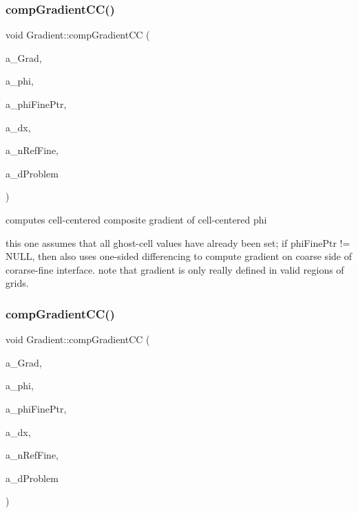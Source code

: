 \subsubsection{\texorpdfstring{comp\+Gradient\+C\+C()}{compGradientCC()}\hspace{0.1cm}{\footnotesize\ttfamily [5/6]}}
{\footnotesize\ttfamily void Gradient\+::comp\+Gradient\+CC (\begin{DoxyParamCaption}\item[{\textbf{ Level\+Data}$<$ \textbf{ F\+Array\+Box} $>$ \&}]{a\+\_\+\+Grad,  }\item[{const \textbf{ Level\+Data}$<$ \textbf{ F\+Array\+Box} $>$ \&}]{a\+\_\+phi,  }\item[{const \textbf{ Level\+Data}$<$ \textbf{ F\+Array\+Box} $>$ $\ast$}]{a\+\_\+phi\+Fine\+Ptr,  }\item[{const \textbf{ Real}}]{a\+\_\+dx,  }\item[{const int}]{a\+\_\+n\+Ref\+Fine,  }\item[{const \textbf{ Problem\+Domain} \&}]{a\+\_\+d\+Problem }\end{DoxyParamCaption})\hspace{0.3cm}{\ttfamily [static]}}



computes cell-\/centered composite gradient of cell-\/centered phi 

this one assumes that all ghost-\/cell values have already been set; if phi\+Fine\+Ptr != N\+U\+LL, then also uses one-\/sided differencing to compute gradient on coarse side of corarse-\/fine interface. note that gradient is only really defined in valid regions of grids. \mbox{\label{class_gradient_ad59fcf73da0f075761f2363b1d1e6c2b}} 
\subsubsection{\texorpdfstring{comp\+Gradient\+C\+C()}{compGradientCC()}\hspace{0.1cm}{\footnotesize\ttfamily [6/6]}}
{\footnotesize\ttfamily void Gradient\+::comp\+Gradient\+CC (\begin{DoxyParamCaption}\item[{\textbf{ Level\+Data}$<$ \textbf{ F\+Array\+Box} $>$ \&}]{a\+\_\+\+Grad,  }\item[{const \textbf{ Level\+Data}$<$ \textbf{ F\+Array\+Box} $>$ \&}]{a\+\_\+phi,  }\item[{const \textbf{ Level\+Data}$<$ \textbf{ F\+Array\+Box} $>$ $\ast$}]{a\+\_\+phi\+Fine\+Ptr,  }\item[{const \textbf{ Real}}]{a\+\_\+dx,  }\item[{const int}]{a\+\_\+n\+Ref\+Fine,  }\item[{const \textbf{ Box} \&}]{a\+\_\+d\+Problem }\end{DoxyParamCaption})\hspace{0.3cm}{\ttfamily [static]}}




